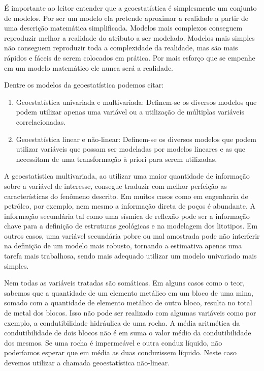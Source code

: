 É importante ao leitor entender que a geoestatística é simplesmente um conjunto de modelos. Por ser um modelo ela pretende aproximar a realidade a partir de uma descrição matemática simplificada. Modelos mais complexos conseguem reproduzir melhor a realidade do atributo a ser modelado. Modelos mais simples não conseguem reproduzir toda a complexidade da realidade, mas são mais rápidos e fáceis de serem colocados em prática. Por mais esforço que se empenhe em um modelo matemático ele nunca será a realidade.

Dentre os modelos da geoestatística podemos citar:

\begin{enumerate}
\item Geoestatística univariada e multivariada: Definem-se os diversos modelos que podem utilizar apenas uma variável ou a utilização de múltiplas variáveis correlacionadas.
\item Geoestatística linear e não-linear: Definem-se os diversos modelos que podem utilizar variáveis que possam ser modeladas por modelos lineares e as que necessitam de uma transformação à priori para serem utilizadas. 
\end{enumerate}

A geoestatística multivariada, ao utilizar uma maior quantidade de informação sobre a variável de interesse, consegue traduzir com melhor perfeição as características do fenômeno descrito. Em muitos casos como em engenharia de petróleo, por exemplo, nem mesmo a informação direta de poços é abundante. A informação secundária tal como uma sísmica de reflexão pode ser a informação chave para a definição de estruturas geológicas e na modelagem dos litotipos. Em outros casos, uma variável secundária pobre ou mal amostrada pode não interferir na definição de um modelo mais robusto, tornando a estimativa apenas uma tarefa mais trabalhosa, sendo mais adequado utilizar um modelo univariado mais simples. 

Nem todas as variáveis tratadas são somáticas. Em alguns casos como o teor, sabemos que a quantidade de um elemento metálico em um bloco de uma mina, somado com a quantidade de elemento metálico de outro bloco, resulta no total de metal dos blocos. Isso não pode ser realizado com algumas variáveis como por exemplo, a condutibilidade hidráulica de uma rocha. A média aritmética da condutibilidade de dois blocos não é em suma o valor médio da condutibilidade dos mesmos. Se uma rocha é impermeável e outra conduz líquido, não poderíamos esperar que em média as duas conduzissem líquido. Neste caso devemos utilizar a chamada geoestatística não-linear. 

